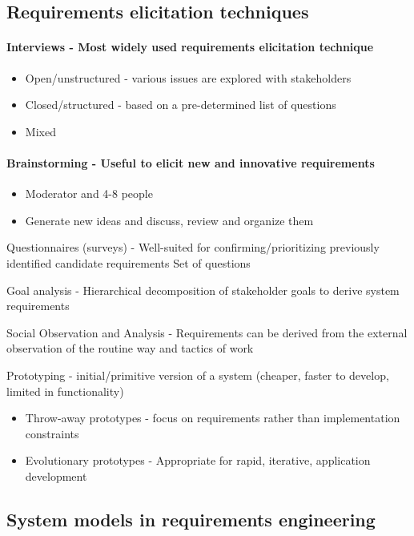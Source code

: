 \documentclass[../ESOF_notes.tex]{subfiles}
\begin{document}
\subsection{Requirements elicitation techniques}

\paragraph{Interviews - Most widely used requirements elicitation technique}
\begin{itemize}
    \item Open/unstructured - various issues are explored with stakeholders
    \item Closed/structured - based on a pre-determined list of questions
    \item Mixed
\end{itemize}

\paragraph{Brainstorming - Useful to elicit new and innovative requirements}

\begin{itemize}
    \item Moderator and 4-8 people
    \item Generate new ideas and discuss, review and organize them
\end{itemize}
Questionnaires (surveys) - Well-suited for confirming/prioritizing previously identified candidate requirements
Set of questions


Goal analysis - Hierarchical decomposition of stakeholder goals to derive system requirements

Social Observation and Analysis - Requirements can be derived from the external observation of the routine way and tactics of work

Prototyping - initial/primitive version of a system (cheaper, faster to develop, limited in functionality)
\begin{itemize}
    \item Throw-away prototypes - focus on requirements rather than implementation constraints
    \item Evolutionary prototypes - Appropriate for rapid, iterative, application development
\end{itemize}


\subsection{System models in requirements engineering}
\end{document}
